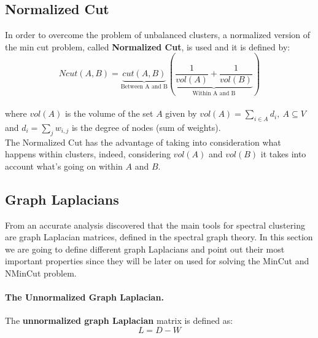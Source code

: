 \subsection{Normalized Cut}
In order to overcome the problem of unbalanced clusters, a normalized version of the min cut problem, called \textbf{Normalized Cut}, is used and it is defined by:\\

$$Ncut(A,B) = \underbrace{cut(A,B)}_{\text{Between A and B}}\left( \underbrace{\frac{1}{vol(A)} + \frac{1}{vol(B)}}_{\text{Within A and B}}\right)$$\\

where $vol(A)$ is the volume of the set $A$ given by $vol(A) = \sum_{i \in A}d_i,~A \subseteq V$ and $d_i = \sum_j w_{i,j}$ is the degree of nodes (sum of weights).\\
The Normalized Cut has the advantage of taking into consideration what happens within clusters, indeed, considering $vol(A)$ and $vol(B)$ it takes into account what's going on within $A$ and $B$.
\newpage

\subsection{Graph Laplacians}
From an accurate analysis \citeauthor{spectral_tutorial} discovered that the main tools for spectral clustering are graph Laplacian matrices, defined in the spectral graph theory.  In this section we are going to define different graph Laplacians and point out their most important properties since they will be later on used for solving the MinCut and NMinCut problem.

\paragraph{The Unnormalized Graph Laplacian.} The  \textbf{unnormalized graph Laplacian} matrix is defined as:
$$L = D - W$$

